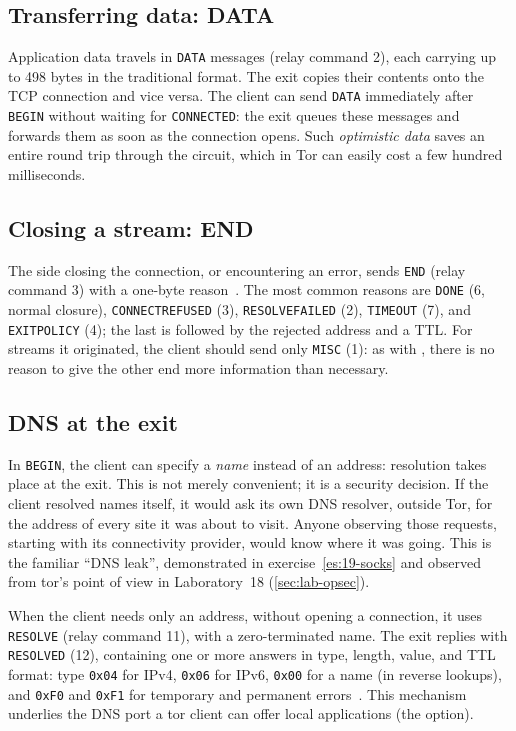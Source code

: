 \subsection{Transferring data: DATA}

Application data travels in \texttt{DATA} messages (relay command 2), each carrying up to 498 bytes in the traditional format. The exit copies their contents onto the TCP connection and vice versa. The client can send \texttt{DATA} immediately after \texttt{BEGIN} without waiting for \texttt{CONNECTED}: the exit queues these messages and forwards them as soon as the connection opens. Such \emph{optimistic data} saves an entire round trip through the circuit, which in Tor can easily cost a few hundred milliseconds.

\subsection{Closing a stream: END}

The side closing the connection, or encountering an error, sends \texttt{END} (relay command 3) with a one-byte reason~. The most common reasons are \texttt{DONE} (6, normal closure), \texttt{CONNECTREFUSED} (3), \texttt{RESOLVEFAILED} (2), \texttt{TIMEOUT} (7), and \texttt{EXITPOLICY} (4); the last is followed by the rejected address and a TTL. For streams it originated, the client should send only \texttt{MISC} (1): as with , there is no reason to give the other end more information than necessary.

\subsection{DNS at the exit}\label{sec:stream-dns}

In \texttt{BEGIN}, the client can specify a \emph{name} instead of an address: resolution takes place at the exit. This is not merely convenient; it is a security decision. If the client resolved names itself, it would ask its own DNS resolver, outside Tor, for the address of every site it was about to visit. Anyone observing those requests, starting with its connectivity provider, would know where it was going. This is the familiar \enquote{DNS leak}, demonstrated in exercise~\ref{es:19-socks} and observed from tor's point of view in Laboratory~18 (\cref{sec:lab-opsec}).

When the client needs only an address, without opening a connection, it uses \texttt{RESOLVE} (relay command 11), with a zero-terminated name. The exit replies with \texttt{RESOLVED} (12), containing one or more answers in type, length, value, and TTL format: type \texttt{0x04} for IPv4, \texttt{0x06} for IPv6, \texttt{0x00} for a name (in reverse lookups), and \texttt{0xF0} and \texttt{0xF1} for temporary and permanent errors~. This mechanism underlies the DNS port a tor client can offer local applications (the  option).

